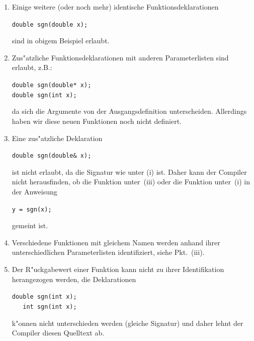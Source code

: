 \begin{enumerate}
 \renewcommand {\labelenumi}{(\roman{enumi})}
 \item Einige weitere (oder noch mehr) identische Funktionsdeklarationen

	\verb|double sgn(double x);|

 	sind in obigem Beispiel erlaubt.
 \item Zus"atzliche Funktionsdeklarationen mit anderen Parameterlisten
 	sind erlaubt, z.B.:

	\verb|double sgn(double* x);| \\
	\verb|double sgn(int x);|

	da sich die Argumente von der Ausgangsdefinition unterscheiden.
	Allerdings  haben wir diese neuen Funktionen noch nicht
	definiert.
 \item  Eine zus"atzliche Deklaration %

	\verb|double sgn(double& x);|

	ist nicht erlaubt, da die Signatur wie unter (i) ist.
	Daher kann der Compiler nicht herausfinden,
	ob  die Funktion unter~(iii) oder die Funktion unter~(i)
	in der  Anweisung

	\verb|y = sgn(x);|

	gemeint ist.
 \item Verschiedene Funktionen mit gleichem Namen werden anhand
 	ihrer unterschiedlichen Parameterlisten identifiziert, siehe
	Pkt.~(iii).
 \item Der R"uckgabewert einer Funktion kann nicht zu ihrer
 	Identifikation herangezogen werden, die Deklarationen

	\verb|double sgn(int x);| \\
	\verb|   int sgn(int x);|

	k"onnen nicht unterschieden werden (gleiche Signatur) und daher lehnt
	der Compiler diesen Quelltext ab.
\end{enumerate}
%
%
%

